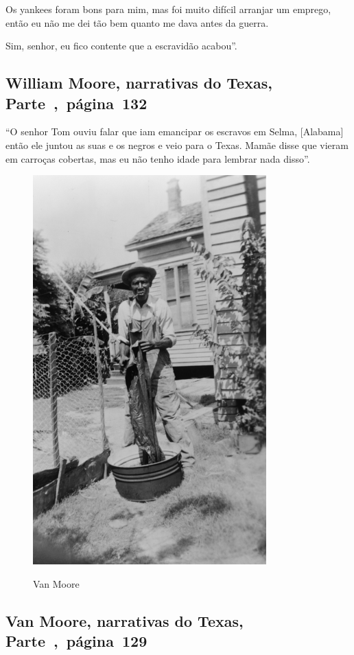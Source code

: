 Os yankees foram bons para mim, mas foi muito difícil arranjar um
emprego, então eu não me dei tão bem quanto me dava antes da guerra.

Sim, senhor, eu fico contente que a escravidão acabou''.

\subsection{William Moore, narrativas do Texas, Parte~,~página~132}
\label{ref199}

``O senhor Tom ouviu falar que iam emancipar os escravos em Selma,
{[}Alabama{]} então ele juntou as suas e os negros e veio para o Texas.
Mamãe disse que vieram em carroças cobertas, mas eu não tenho idade para
lembrar nada disso''.

\begin{figure}[]
\centering
 \includegraphics[width=90mm]{./imgs/vanmoore_recorte.jpg} \label{img22}
\caption{Van Moore}
\end{figure}

\subsection{Van Moore, narrativas do Texas, Parte~,~página~129}
\label{ref196}

